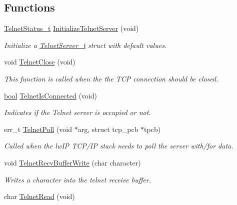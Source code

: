 \subsection*{Functions}
\begin{DoxyCompactItemize}
\item 
\hyperlink{group__telnet__server_gab6653d6c1bd1261ebfcb4d667f848716}{Telnet\-Status\-\_\-t} \hyperlink{group__telnet__server_gae8002482499a83baab72c8714ef609d2}{Initialize\-Telnet\-Server} (void)
\begin{DoxyCompactList}\small\item\em Initialize a \hyperlink{struct_telnet_server__t}{Telnet\-Server\-\_\-t} struct with default values. \end{DoxyCompactList}\item 
void \hyperlink{group__telnet__server_ga26f786d2e47e4bb5f180d2740eebc957}{Telnet\-Close} (void)
\begin{DoxyCompactList}\small\item\em This function is called when the the T\-C\-P connection should be closed. \end{DoxyCompactList}\item 
\hyperlink{group__data__types_ga0ecf26b576b9a54eca656b9be7ba6a06}{bool} \hyperlink{group__telnet__server_ga6509e0047d80aea0570ec903a1e10887}{Telnet\-Is\-Connected} (void)
\begin{DoxyCompactList}\small\item\em Indicates if the Telnet server is occupied or not. \end{DoxyCompactList}\item 
err\-\_\-t \hyperlink{group__telnet__server_ga8946efc99077a959cb1cad3e059f9071}{Telnet\-Poll} (void $\ast$arg, struct tcp\-\_\-pcb $\ast$tpcb)
\begin{DoxyCompactList}\small\item\em Called when the lw\-I\-P T\-C\-P/\-I\-P stack needs to poll the server with/for data. \end{DoxyCompactList}\item 
void \hyperlink{group__telnet__server_ga93c1e298d9778f890b6df05b35072988}{Telnet\-Recv\-Buffer\-Write} (char character)
\begin{DoxyCompactList}\small\item\em Writes a character into the telnet receive buffer. \end{DoxyCompactList}\item 
char \hyperlink{group__telnet__server_gaff55b8914481cb32d621a855a69a5635}{Telnet\-Read} (void)

\end{DoxyCompactItemize}
